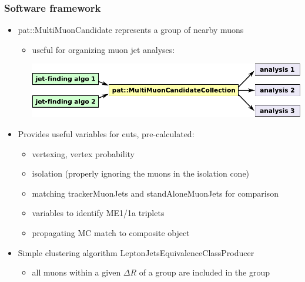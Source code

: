 \documentclass[compress]{beamer}
\begin{document}
\begin{frame}
\frametitle{Software framework}

\begin{itemize}
\item pat::MultiMuonCandidate represents a group of nearby muons
\begin{itemize}
\item useful for organizing muon jet analyses:

\vspace{0.1 cm}
\includegraphics[width=0.9\linewidth]{jets_to_analyses.pdf}

\end{itemize}

\item Provides useful variables for cuts, pre-calculated:
\begin{itemize}
\item vertexing, vertex probability
\item isolation (properly ignoring the muons in the isolation cone)
\item matching trackerMuonJets and standAloneMuonJets for comparison
\item variables to identify ME1/1a triplets
\item propagating MC match to composite object
\end{itemize}

\item Simple clustering algorithm LeptonJetsEquivalenceClassProducer
\begin{itemize}
\item all muons within a given $\Delta R$ of a group are included in the group
\end{itemize}
\end{itemize}
\end{frame}
\end{document}
